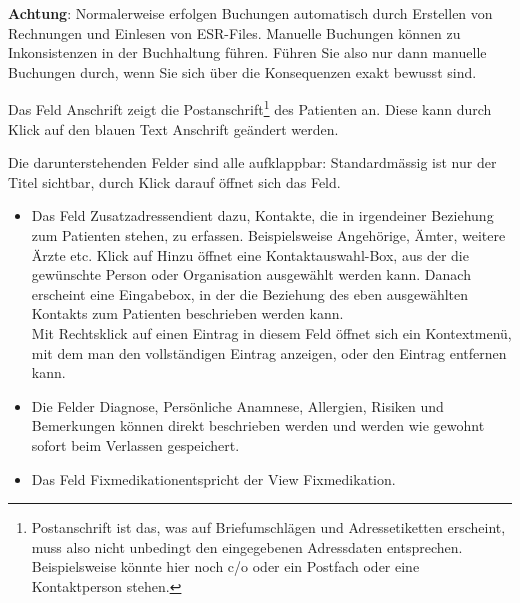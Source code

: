 \textbf{Achtung}: Normalerweise erfolgen Buchungen automatisch durch Erstellen
von Rechnungen und Einlesen von ESR-Files. Manuelle Buchungen können zu
Inkonsistenzen in der Buchhaltung führen. Führen Sie also nur dann manuelle
Buchungen durch, wenn Sie sich über die Konsequenzen exakt bewusst sind.

Das Feld \glqq Anschrift\grqq{} zeigt die Postanschrift\footnote{Postanschrift ist das, was auf Briefumschlägen und Adressetiketten erscheint, muss also nicht unbedingt den eingegebenen Adressdaten entsprechen. Beispielsweise könnte hier noch c/o oder ein Postfach oder eine Kontaktperson stehen.} des Patienten an. Diese
kann durch Klick auf den blauen Text \glqq Anschrift \grqq{}geändert werden.

Die darunterstehenden Felder sind alle aufklappbar: Standardmässig ist nur der
Titel sichtbar, durch Klick darauf öffnet sich das Feld.
\begin{itemize}
  \item Das Feld \glqq Zusatzadressen\grqq{}dient dazu, Kontakte, die in
  irgendeiner Beziehung zum Patienten stehen, zu erfassen. Beispielsweise
  Angehörige, Ämter, weitere Ärzte etc. Klick auf \glqq Hinzu\grqq{} öffnet eine
  Kontaktauswahl-Box, aus der die gewünschte Person oder Organisation ausgewählt
  werden kann. Danach erscheint eine Eingabebox, in der die Beziehung des eben
  ausgewählten Kontakts zum Patienten beschrieben werden kann. \\
  Mit Rechtsklick auf einen Eintrag in diesem Feld öffnet sich ein Kontextmenü,
  mit dem man den vollständigen Eintrag anzeigen, oder den Eintrag entfernen kann.
  \item Die Felder \glqq Diagnose\grqq, \glqq Persönliche Anamnese\grqq{},
  \glqq Allergien\grqq{}, \glqq Risiken\grqq{} und \glqq Bemerkungen \grqq{}
  können direkt beschrieben werden und werden wie gewohnt sofort beim Verlassen
  gespeichert.
  \item Das Feld \glqq Fixmedikation\grqq{}entspricht der View Fixmedikation.

\end{itemize}

